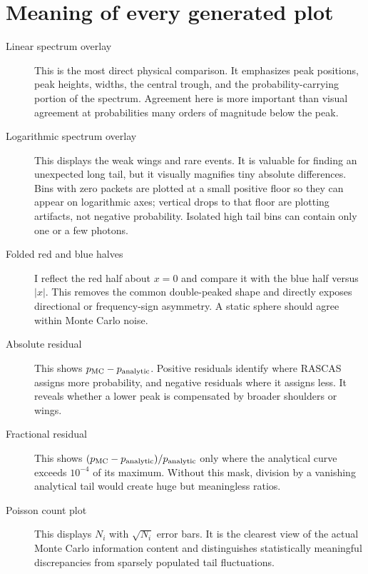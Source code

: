 \documentclass[11pt,a4paper]{article}
\begin{document}
\section{Meaning of every generated plot}

\begin{description}
\item[Linear spectrum overlay]
This is the most direct physical comparison.  It emphasizes peak positions,
peak heights, widths, the central trough, and the probability-carrying portion
of the spectrum.  Agreement here is more important than visual agreement at
probabilities many orders of magnitude below the peak.

\item[Logarithmic spectrum overlay]
This displays the weak wings and rare events.  It is valuable for finding an
unexpected long tail, but it visually magnifies tiny absolute differences.
Bins with zero packets are plotted at a small positive floor so they can appear
on logarithmic axes; vertical drops to that floor are plotting artifacts, not
negative probability.  Isolated high tail bins can contain only one or a few
photons.

\item[Folded red and blue halves]
I reflect the red half about $x=0$ and compare it with the blue half versus
$|x|$.  This removes the common double-peaked shape and directly exposes
directional or frequency-sign asymmetry.  A static sphere should agree within
Monte Carlo noise.

\item[Absolute residual]
This shows $p_{\rm MC}-p_{\rm analytic}$.  Positive residuals identify where
RASCAS assigns more probability, and negative residuals where it assigns less.
It reveals whether a lower peak is compensated by broader shoulders or wings.

\item[Fractional residual]
This shows $(p_{\rm MC}-p_{\rm analytic})/p_{\rm analytic}$ only where the
analytical curve exceeds $10^{-4}$ of its maximum.  Without this mask,
division by a vanishing analytical tail would create huge but meaningless
ratios.

\item[Poisson count plot]
This displays $N_i$ with $\sqrt{N_i}$ error bars.  It is the clearest view of
the actual Monte Carlo information content and distinguishes statistically
meaningful discrepancies from sparsely populated tail fluctuations.
\end{description}
\end{document}
